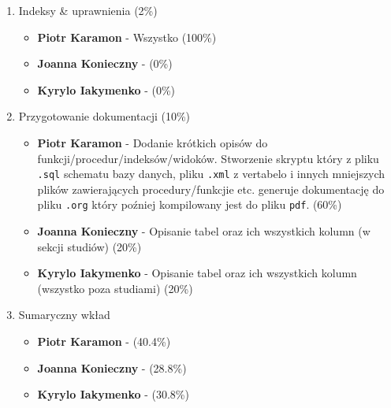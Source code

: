 \documentclass[11pt]{article}
\begin{document}
\begin{enumerate}
\begin{itemize}
\end{itemize}
\item Indeksy \& uprawnienia (2\%)
\begin{itemize}
\item \textbf{Piotr Karamon} - Wszystko (100\%)
\item \textbf{Joanna Konieczny} - (0\%)
\item \textbf{Kyrylo Iakymenko} - (0\%)
\end{itemize}
\item Przygotowanie dokumentacji (10\%)
\begin{itemize}
\item \textbf{Piotr Karamon} - Dodanie krótkich opisów do funkcji/procedur/indeksów/widoków. Stworzenie skryptu
który z pliku \texttt{.sql} schematu bazy danych, pliku \texttt{.xml} z vertabelo i innych mniejszych plików zawierających
procedury/funkcjie etc. generuje dokumentację do pliku \texttt{.org} który poźniej kompilowany jest do pliku \texttt{pdf}.
(60\%)
\item \textbf{Joanna Konieczny} - Opisanie tabel oraz ich wszystkich kolumn (w sekcji studiów) (20\%)
\item \textbf{Kyrylo Iakymenko} - Opisanie tabel oraz ich wszystkich kolumn (wszystko poza studiami) (20\%)
\end{itemize}
\item Sumaryczny wkład
\begin{itemize}
\item \textbf{Piotr Karamon}  - (40.4\%)
\item \textbf{Joanna Konieczny} - (28.8\%)
\item \textbf{Kyrylo Iakymenko} - (30.8\%)
\end{itemize}
\end{enumerate}
\end{document}
